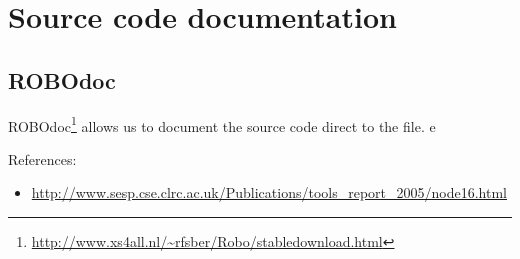 
\chapter{Source code documentation}
\label{chap:source-code-docum}

\section{ROBOdoc}
\label{sec:robodoc}


ROBOdoc\footnote{\url{http://www.xs4all.nl/~rfsber/Robo/stabledownload.html}}
allows us to document the source code direct to the file. e

References:
\begin{itemize}
\item
  \url{http://www.sesp.cse.clrc.ac.uk/Publications/tools_report_2005/node16.html}

\end{itemize}
